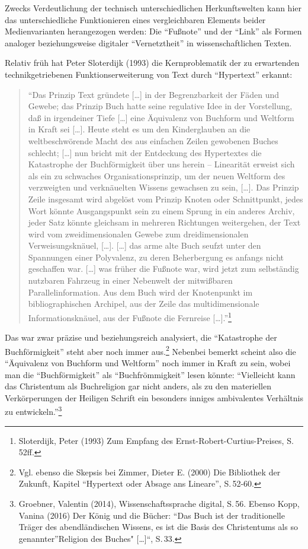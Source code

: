 \documentclass[a4paper,
fontsize=11pt,
oneside,
numbers=noperiodatend,
parskip=half-,
bibliography=totoc,
final
]{scrartcl}
\begin{document}
Zwecks Verdeutlichung der technisch unterschiedlichen Herkunftswelten
kann hier das unterschiedliche Funktionieren eines vergleichbaren
Elements beider Medienvarianten herangezogen werden: Die
\enquote{Fußnote} und der \enquote{Link} als Formen analoger
beziehungsweise digitaler \enquote{Vernetztheit} in wissenschaftlichen
Texten.

Relativ früh hat Peter Sloterdijk (1993) die Kernproblematik der zu
erwartenden technikgetriebenen Funktionserweiterung von Text durch
\enquote{Hypertext} erkannt:

\begin{quote}
\enquote{Das Prinzip Text gründete {[}\ldots{}{]} in der Begrenzbarkeit
der Fäden und Gewebe; das Prinzip Buch hatte seine regulative Idee in
der Vorstellung, daß in irgendeiner Tiefe {[}\ldots{}{]} eine Äquivalenz
von Buchform und Weltform in Kraft sei {[}\ldots{}{]}. Heute steht es um
den Kinderglauben an die weltbeschwörende Macht des aus einfachen Zeilen
gewobenen Buches schlecht; {[}\ldots{}{]} nun bricht mit der Entdeckung
des Hypertextes die Katastrophe der Buchförmigkeit über uns herein --
Linearität erweist sich als ein zu schwaches Organisationsprinzip, um
der neuen Weltform des verzweigten und verknäuelten Wissens gewachsen zu
sein, {[}\ldots{}{]}. Das Prinzip Zeile insgesamt wird abgelöst vom
Prinzip Knoten oder Schnittpunkt, jedes Wort könnte Ausgangspunkt sein
zu einem Sprung in ein anderes Archiv, jeder Satz könnte gleichsam in
mehreren Richtungen weitergehen, der Text wird vom zweidimensionalen
Gewebe zum dreidimensionalen Verweisungsknäuel, {[}\ldots{}{]}.
{[}\ldots{}{]} das arme alte Buch seufzt unter den Spannungen einer
Polyvalenz, zu deren Beherbergung es anfangs nicht geschaffen war.
{[}\ldots{}{]} was früher die Fußnote war, wird jetzt zum selbständig
nutzbaren Fahrzeug in einer Nebenwelt der mitwißbaren
Parallelinformation. Aus dem Buch wird der Knotenpunkt im
bibliographischen Archipel, aus der Zeile das multidimensionale
Informationsknäuel, aus der Fußnote die Fernreise
{[}\ldots{}{]}.}\footnote{Sloterdijk, Peter (1993) Zum Empfang des
  Ernst-Robert-Curtius-Preises, S.\,52ff.}
\end{quote}

Das war zwar präzise und beziehungsreich analysiert, die
\enquote{Katastrophe der Buchförmigkeit} steht aber noch immer
aus.\footnote{Vgl. ebenso die Skepsis bei Zimmer, Dieter E. (2000) Die
  Bibliothek der Zukunft, Kapitel \enquote{Hypertext oder Absage ans
  Lineare}, S.\,52-60.} Nebenbei bemerkt scheint also die
\enquote{Äquivalenz von Buchform und Weltform} noch immer in Kraft zu
sein, wobei man die \enquote{Buchförmigkeit} als
\enquote{Buchfrömmigkeit} lesen könnte: \enquote{Vielleicht kann das
Christentum als Buchreligion gar nicht anders, als zu den materiellen
Verkörperungen der Heiligen Schrift ein besonders inniges ambivalentes
Verhältnis zu entwickeln.}\footnote{Groebner, Valentin (2014),
  Wissenschaftssprache digital, S.\,56. Ebenso Kopp, Vanina (2016) Der
  König und die Bücher: \enquote{Das Buch ist der traditionelle Träger
  des abendländischen Wissens, es ist die Basis des Christentums als so
  genannter}Religion des Buches" {[}\ldots{}{]}``, S.\,33.}
\end{document}
